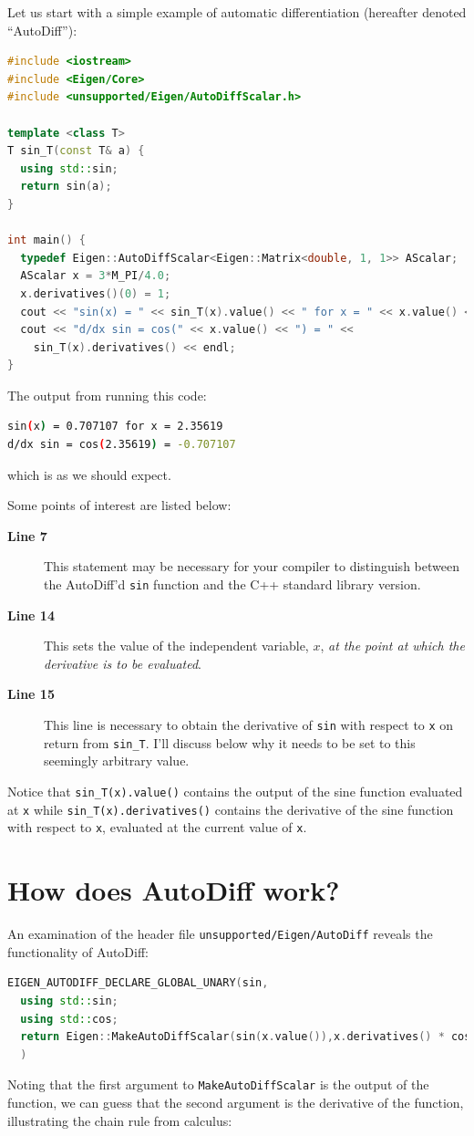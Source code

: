 \documentclass[letterpaper, 12 pt, onecolumn, journal]{IEEEtran}  %
\begin{document}
Let us start with a simple example of automatic differentiation (hereafter denoted ``AutoDiff''):
\begin{lstlisting}[language=C++]
#include <iostream>
#include <Eigen/Core>
#include <unsupported/Eigen/AutoDiffScalar.h>

template <class T>
T sin_T(const T& a) {
  using std::sin;
  return sin(a);
}

int main() {
  typedef Eigen::AutoDiffScalar<Eigen::Matrix<double, 1, 1>> AScalar;
  AScalar x = 3*M_PI/4.0;
  x.derivatives()(0) = 1;
  cout << "sin(x) = " << sin_T(x).value() << " for x = " << x.value() << endl;
  cout << "d/dx sin = cos(" << x.value() << ") = " << 
    sin_T(x).derivatives() << endl;
}
\end{lstlisting}
The output from running this code:
\begin{lstlisting}[language=bash]
sin(x) = 0.707107 for x = 2.35619
d/dx sin = cos(2.35619) = -0.707107
\end{lstlisting}
which is as we should expect.

Some points of interest are listed below:
\begin{description}
 \item [\textbf{Line 7} ]\quad This statement may be necessary for your compiler to distinguish between the AutoDiff'd \texttt{sin} function and the C++ standard library version.
 \item [\textbf{Line 14} ]\quad This sets the value of the independent variable, $x$, \emph{at the point at which the derivative is to be evaluated}.
 \item [\textbf{Line 15}\ ]\quad This line is necessary to obtain the derivative of \texttt{sin} with respect to \texttt{x} on return from \texttt{sin\_T}. I'll discuss below why it needs to be set to this seemingly arbitrary value.
\end{description}

\raggedright
Notice that \texttt{sin\_T(x).value()} contains the output of the sine function evaluated at \texttt{x} while \texttt{sin\_T(x).derivatives()} contains the derivative of the sine function with respect to \texttt{x}, evaluated at the current value of \texttt{x}.
\flushleft

\section{How does AutoDiff work?}
\label{section:chain-rule}
An examination of the header file \texttt{unsupported/Eigen/AutoDiff} reveals the functionality of AutoDiff:
\begin{lstlisting}[language=C++]
EIGEN_AUTODIFF_DECLARE_GLOBAL_UNARY(sin,
  using std::sin;
  using std::cos;
  return Eigen::MakeAutoDiffScalar(sin(x.value()),x.derivatives() * cos(x.value()));
  )
\end{lstlisting}
Noting that the first argument to \texttt{MakeAutoDiffScalar} is the output of the function, we can guess that the second argument is the derivative of the function, illustrating the chain rule from calculus:
\end{document}
